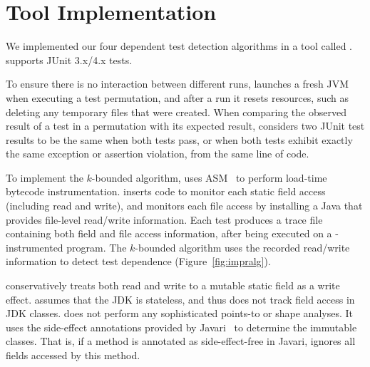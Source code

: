 \section{Tool Implementation}
\label{sec:impl}


We implemented our four dependent test detection algorithms in
a tool called \ourtool. \ourtool
supports JUnit 3.x/4.x tests. %

To ensure there is no interaction between
different runs, \ourtool launches a fresh JVM
when executing a test permutation, and after a run it resets resources,
such as deleting any temporary files that were created.
When comparing the observed result of
a test in a permutation with its expected result,
\ourtool considers two JUnit test results to be the same when both
tests pass, or when both tests exhibit exactly the same exception
or assertion violation, from the same line of code.

To implement the \dependenceaware{} $k$-bounded
algorithm, \ourtool uses ASM~\cite{asm} to perform load-time bytecode
instrumentation. \ourtool inserts code to monitor each
static field access (including read and write), and
monitors each file access by
installing a Java  that provides 
file-level read/write information.
Each test produces a trace file containing both
field and file access information, after being executed
on a \ourtool-instrumented program. The \dependenceaware{} $k$-bounded
algorithm uses the recorded read/write information to detect
test dependence (Figure~\ref{fig:impralg}).

\ourtool conservatively treats both read
and write to a mutable static field as a write effect.
\ourtool assumes that the JDK is stateless,
and thus does not track field access in JDK classes. 
\ourtool does not perform any sophisticated points-to or shape
analyses. It uses the side-effect annotations
provided by Javari~\cite{QuinonezTE2008} to determine the immutable
classes. That is, if a method is annotated as side-effect-free
in Javari, \ourtool ignores all fields accessed by this method.



